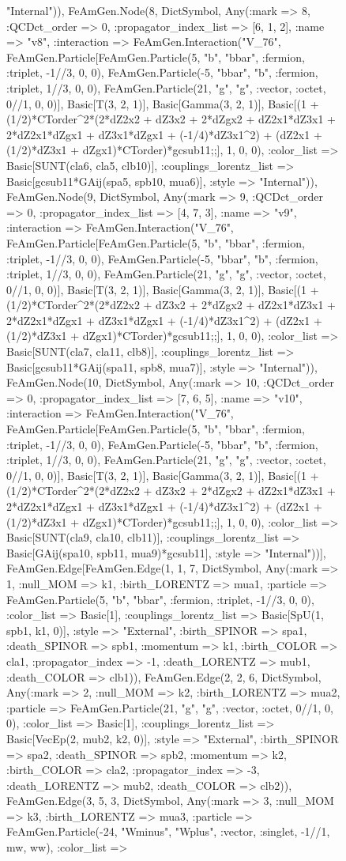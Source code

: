 \documentclass{revtex4}
\begin{document}
\begin{figure}[!htb]
\begin{center}
{"Internal")), FeAmGen.Node(8, Dict{Symbol, Any}(:mark => 8, :QCDct_order => 0, :propagator_index_list => [6, 1, 2], :name => "v8", :interaction => FeAmGen.Interaction("V_76", FeAmGen.Particle[FeAmGen.Particle(5, "b", "bbar", :fermion, :triplet, -1//3, 0, 0), FeAmGen.Particle(-5, "bbar", "b", :fermion, :triplet, 1//3, 0, 0), FeAmGen.Particle(21, "g", "g", :vector, :octet, 0//1, 0, 0)], Basic[T(3, 2, 1)], Basic[Gamma(3, 2, 1)], Basic[(1 + (1/2)*CTorder^2*(2*dZ2x2 + dZ3x2 + 2*dZgx2 + dZ2x1*dZ3x1 + 2*dZ2x1*dZgx1 + dZ3x1*dZgx1 + (-1/4)*dZ3x1^2) + (dZ2x1 + (1/2)*dZ3x1 + dZgx1)*CTorder)*gcsub11;;], 1, 0, 0), :color_list => Basic[SUNT(cla6, cla5, clb10)], :couplings_lorentz_list => Basic[gcsub11*GAij(spa5, spb10, mua6)], :style => "Internal")), FeAmGen.Node(9, Dict{Symbol, Any}(:mark => 9, :QCDct_order => 0, :propagator_index_list => [4, 7, 3], :name => "v9", :interaction => FeAmGen.Interaction("V_76", FeAmGen.Particle[FeAmGen.Particle(5, "b", "bbar", :fermion, :triplet, -1//3, 0, 0), FeAmGen.Particle(-5, "bbar", "b", :fermion, :triplet, 1//3, 0, 0), FeAmGen.Particle(21, "g", "g", :vector, :octet, 0//1, 0, 0)], Basic[T(3, 2, 1)], Basic[Gamma(3, 2, 1)], Basic[(1 + (1/2)*CTorder^2*(2*dZ2x2 + dZ3x2 + 2*dZgx2 + dZ2x1*dZ3x1 + 2*dZ2x1*dZgx1 + dZ3x1*dZgx1 + (-1/4)*dZ3x1^2) + (dZ2x1 + (1/2)*dZ3x1 + dZgx1)*CTorder)*gcsub11;;], 1, 0, 0), :color_list => Basic[SUNT(cla7, cla11, clb8)], :couplings_lorentz_list => Basic[gcsub11*GAij(spa11, spb8, mua7)], :style => "Internal")), FeAmGen.Node(10, Dict{Symbol, Any}(:mark => 10, :QCDct_order => 0, :propagator_index_list => [7, 6, 5], :name => "v10", :interaction => FeAmGen.Interaction("V_76", FeAmGen.Particle[FeAmGen.Particle(5, "b", "bbar", :fermion, :triplet, -1//3, 0, 0), FeAmGen.Particle(-5, "bbar", "b", :fermion, :triplet, 1//3, 0, 0), FeAmGen.Particle(21, "g", "g", :vector, :octet, 0//1, 0, 0)], Basic[T(3, 2, 1)], Basic[Gamma(3, 2, 1)], Basic[(1 + (1/2)*CTorder^2*(2*dZ2x2 + dZ3x2 + 2*dZgx2 + dZ2x1*dZ3x1 + 2*dZ2x1*dZgx1 + dZ3x1*dZgx1 + (-1/4)*dZ3x1^2) + (dZ2x1 + (1/2)*dZ3x1 + dZgx1)*CTorder)*gcsub11;;], 1, 0, 0), :color_list => Basic[SUNT(cla9, cla10, clb11)], :couplings_lorentz_list => Basic[GAij(spa10, spb11, mua9)*gcsub11], :style => "Internal"))], FeAmGen.Edge[FeAmGen.Edge(1, 1, 7, Dict{Symbol, Any}(:mark => 1, :null_MOM => k1, :birth_LORENTZ => mua1, :particle => FeAmGen.Particle(5, "b", "bbar", :fermion, :triplet, -1//3, 0, 0), :color_list => Basic[1], :couplings_lorentz_list => Basic[SpU(1, spb1, k1, 0)], :style => "External", :birth_SPINOR => spa1, :death_SPINOR => spb1, :momentum => k1, :birth_COLOR => cla1, :propagator_index => -1, :death_LORENTZ => mub1, :death_COLOR => clb1)), FeAmGen.Edge(2, 2, 6, Dict{Symbol, Any}(:mark => 2, :null_MOM => k2, :birth_LORENTZ => mua2, :particle => FeAmGen.Particle(21, "g", "g", :vector, :octet, 0//1, 0, 0), :color_list => Basic[1], :couplings_lorentz_list => Basic[VecEp(2, mub2, k2, 0)], :style => "External", :birth_SPINOR => spa2, :death_SPINOR => spb2, :momentum => k2, :birth_COLOR => cla2, :propagator_index => -3, :death_LORENTZ => mub2, :death_COLOR => clb2)), FeAmGen.Edge(3, 5, 3, Dict{Symbol, Any}(:mark => 3, :null_MOM => k3, :birth_LORENTZ => mua3, :particle => FeAmGen.Particle(-24, "Wminus", "Wplus", :vector, :singlet, -1//1, mw, ww), :color_list => }
\end{center}
\end{figure}
\end{document}
